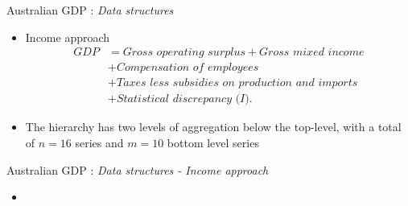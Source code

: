 \documentclass[11pt,xcolor=dvipsnames,handout]{beamer} %
\begin{document}
\begin{frame}{Australian GDP : \textit{Data structures}}
\begin{itemize}[<+-| alert@+>]
	\item[] 
	
\begin{block}{Income approach}
		\begin{align*}
	\textit{GDP}
	& = \textit{Gross operating surplus} + \textit{Gross mixed income} \\
	& + \textit{Compensation of employees} \\
	& + \textit{Taxes less subsidies on production and imports} \\
	& + \textit{Statistical discrepancy (I)}.
	\end{align*}
\end{block}
	\item  The hierarchy has two levels of aggregation below the top-level, with a total of $n=16$ series and $m=10$ bottom level series

\end{itemize}
\end{frame}



\begin{frame}{Australian GDP : \textit{Data structures - Income approach}}
\begin{itemize}[<+-| alert@+>]
	\item[] 
	\begin{figure}
	\end{figure}	
	
\end{itemize}
\end{frame}
\end{document}
